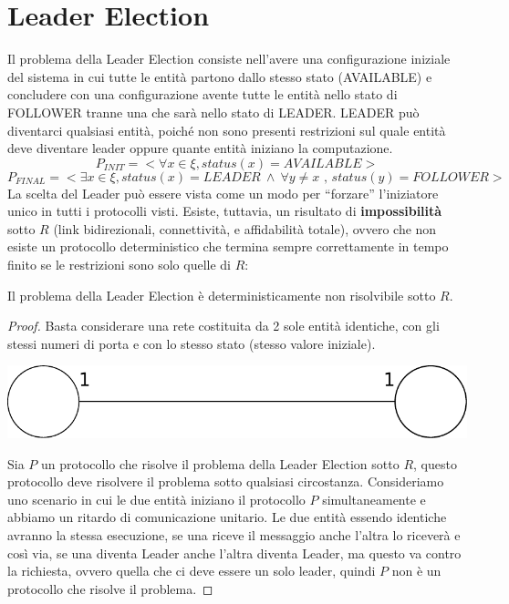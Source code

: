 \chapter{Leader Election}

Il problema della Leader Election consiste nell'avere una configurazione
iniziale del sistema in cui tutte le entità partono dallo stesso stato
(AVAILABLE) e concludere con una configurazione avente tutte le entità nello
stato di FOLLOWER tranne una che sarà nello stato di LEADER.
LEADER può diventarci qualsiasi entità, poiché non sono presenti restrizioni sul
quale entità deve diventare leader oppure quante entità iniziano la
computazione.
$$P_{INIT}=< \forall x \in \xi, status(x)=AVAILABLE >$$
$$P_{FINAL}=< \exists x \in \xi, status(x)=LEADER \ \wedge \ \forall y \neq x
    \text{ , } status(y)=FOLLOWER >$$ La scelta del Leader può essere vista come un
modo per ``forzare'' l'iniziatore unico in tutti i protocolli visti. Esiste,
tuttavia, un risultato di \textbf{impossibilità} sotto $R$ (link bidirezionali,
connettività, e affidabilità totale), ovvero che non esiste un protocollo
deterministico che termina sempre correttamente in tempo finito se le
restrizioni sono solo quelle di $R$:

\begin{theorem}
    Il problema della Leader Election è deterministicamente non
    risolvibile sotto $R$.
\end{theorem}

\begin{proof}
    Basta considerare una rete costituita da 2 sole entità identiche, con gli
    stessi numeri di porta e con lo stesso stato (stesso valore iniziale).

    \begin{center}
        \includegraphics[scale=0.3]{capitoli/leader-election/imgs/n_42}
    \end{center}
    Sia $P$ un protocollo che risolve il problema della Leader Election sotto $R$,
    questo protocollo deve risolvere il problema sotto qualsiasi circostanza.
    Consideriamo uno scenario in cui le due entità iniziano il protocollo $P$
    simultaneamente e abbiamo un ritardo di comunicazione unitario. Le due
    entità essendo identiche avranno la stessa esecuzione, se una riceve il
    messaggio anche l'altra lo riceverà e così via, se una diventa Leader anche
    l'altra diventa Leader, ma questo va contro la richiesta, ovvero quella che
    ci deve essere un solo leader, quindi $P$ non è un protocollo che risolve il
    problema.
\end{proof}

